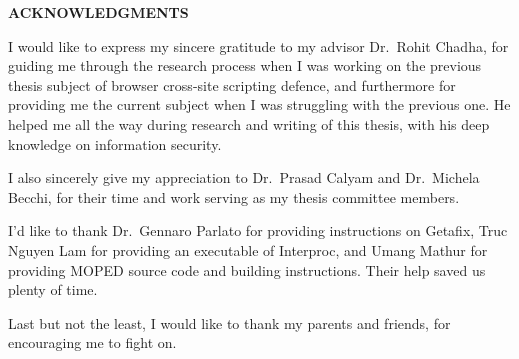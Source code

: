 \newpage
{}
\setcounter{page}{2}

\centerline{\bf \large ACKNOWLEDGMENTS}
\vskip 10mm %
I would like to express my sincere gratitude to my advisor Dr.~Rohit Chadha, for guiding me through the research process when I was working on the previous thesis subject of browser cross-site scripting defence, and furthermore for providing me the current subject when I was struggling with the previous one. He helped me all the way during research and writing of this thesis, with his deep knowledge on information security.

I also sincerely give my appreciation to Dr.~Prasad Calyam and Dr.~Michela Becchi, for their time and work serving as my thesis committee members.

I'd like to thank Dr.~Gennaro Parlato for providing instructions on Getafix, Truc Nguyen Lam for providing an executable of Interproc, and Umang Mathur for providing MOPED source code and building instructions. Their help saved us plenty of time. 

Last but not the least, I would like to thank my parents and friends, for encouraging me to fight on.
